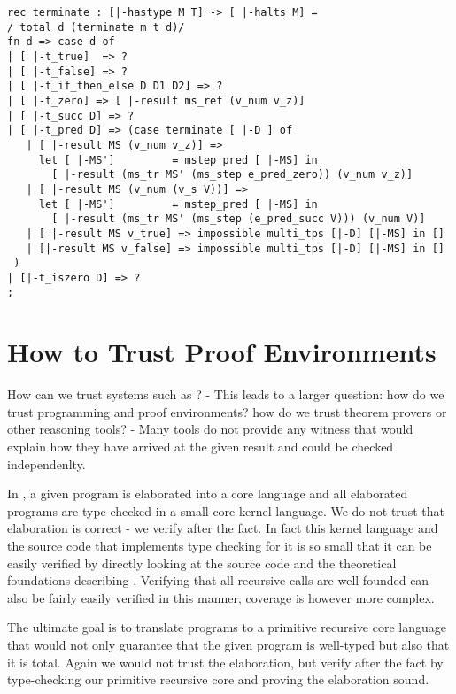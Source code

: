 \begin{lstlisting}
rec terminate : [|-hastype M T] -> [ |-halts M] =
/ total d (terminate m t d)/
fn d => case d of
| [ |-t_true]  => ?
| [ |-t_false] => ?
| [ |-t_if_then_else D D1 D2] => ?
| [ |-t_zero] => [ |-result ms_ref (v_num v_z)]
| [ |-t_succ D] => ?
| [ |-t_pred D] => (case terminate [ |-D ] of
   | [ |-result MS (v_num v_z)] =>
     let [ |-MS']         = mstep_pred [ |-MS] in
       [ |-result (ms_tr MS' (ms_step e_pred_zero)) (v_num v_z)]
   | [ |-result MS (v_num (v_s V))] =>
     let [ |-MS']         = mstep_pred [ |-MS] in
       [ |-result (ms_tr MS' (ms_step (e_pred_succ V))) (v_num V)]
   | [ |-result MS v_true] => impossible multi_tps [|-D] [|-MS] in []
   | [|-result MS v_false] => impossible multi_tps [|-D] [|-MS] in []
 )
| [|-t_iszero D] => ?
;
\end{lstlisting}



\section{How to Trust Proof Environments}
How can we trust systems such as \beluga? - This leads to a larger question: how do we trust programming and proof environments? how do we trust theorem provers or other reasoning tools? - Many tools do not provide any witness that would explain how they have arrived at the given result and could be checked independenlty.

In \beluga, a given program is elaborated into a core language and all elaborated programs are type-checked in a small core kernel language. We do not trust that elaboration is correct - we verify after the fact. In fact this kernel language and the source code that implements type checking for it is so small that it can be easily verified by directly looking at the source code and the theoretical foundations describing \beluga. Verifying that all recursive calls are well-founded can also be fairly easily verified in this manner; coverage is however more complex.

The ultimate goal is to translate \beluga programs to a primitive recursive core language that would not only guarantee that the given program is well-typed but also that it is total. Again we would not trust the elaboration, but verify after the fact by type-checking our primitive recursive core and proving the elaboration sound.

